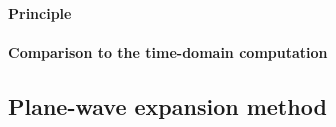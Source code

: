 \paragraph{Principle} 
\paragraph{Comparison to the time-domain computation} 

\subsection{Plane-wave expansion method} %
